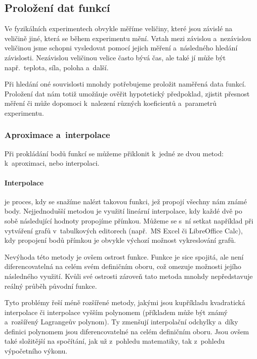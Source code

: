 \subsection{Proložení dat funkcí}
Ve fyzikálních experimentech obvykle měříme veličiny, které jsou závislé na
veličině jiné, která se během experimentu mění. Vztah mezi závislou
a~nezávislou veličinou jsme schopni vysledovat pomocí jejich měření a~následného
hledání závislosti.  Nezávislou veličinou velice často bývá čas, ale také jí
může být např.~teplota, síla, poloha a~další.~\cite{praktikum}
 
Při hledání oné souvislosti mnohdy potřebujeme proložit naměřená data funkcí.
Proložení dat nám totiž umožňuje ověřit hypotetický předpoklad, zjistit přesnost
měření či může dopomoci k~nalezení různých koeficientů a~parametrů experimentu.

\subsubsection{Aproximace a~interpolace}
Při prokládání bodů funkcí se můžeme přiklonit k~jedné ze dvou metod:
k~aproximaci, nebo interpolaci.

\paragraph{Interpolace} je proces, kdy se snažíme nalézt takovou funkci, jež
propojí všechny nám známé body. Nejjednodušší metodou %
je využití lineární interpolace, kdy každé dvě po sobě následující hodnoty
propojíme přímkou. Můžeme se s~ní setkat například při vytváření grafů
v~tabulkových editorech (např.~MS Excel či LibreOffice Calc), kdy propojení
bodů přímkou je obvykle výchozí možnost vykreslování grafů. 

Nevýhoda této metody je ovšem ostrost funkce. Funkce je sice spojitá, ale není
diferencovatelná na celém svém definičním oboru, což omezuje možnosti jejího
následného využití. Kvůli své ostrosti zároveň tato metoda mnohdy nepředstavuje
reálný průběh původní funkce.~\cite{segeth}

Tyto problémy řeší méně rozšířené metody, jakými jsou kupříkladu kvadratická
interpolace či interpolace vyšším polynomem (příkladem může být známý
a~rozšířený Lagrangeův polynom). Ty zmenšují interpolační odchylky a~díky
definici polynomem jsou diferencovatelné na celém definičním oboru. Jsou ovšem
také složitější na spočítání, jak už z~pohledu matematiky, tak z~pohledu
výpočetního výkonu.

